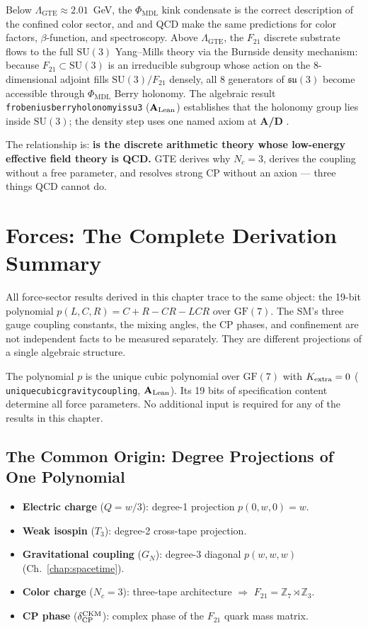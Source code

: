 \documentclass[11pt,openany]{book}
\theoremstyle{remark}
\newcommand{\GTE}{\text{GTE}}
\newcommand{\PHIMDL}{\Phi_{\mathrm{MDL}}}
\newcommand{\ZS}{\mathbb{Z}_7}
\newcommand{\lean}[1]{%
  \penalty-100
  \begingroup\def\_{\textunderscore\allowbreak}\texttt{#1}\endgroup}
\newcommand{\Nc}{N_c}
\newcommand{\CatAL}{\ensuremath{\textbf{A}_{\rm Lean}}}
\newcommand{\CatAD}{\textbf{A/D}}
\begin{document}
Below $\Lambda_{\GTE} \approx 2.01$~GeV, the $\PHIMDL$ kink condensate is the correct
description of the confined color sector, and \GTE{} and QCD make the same predictions
for color factors, $\beta$-function, and spectroscopy.  Above $\Lambda_{\GTE}$, the
$F_{21}$ discrete substrate flows to the full $\mathrm{SU}(3)$ Yang--Mills theory via the
Burnside density mechanism: because $F_{21} \subset \mathrm{SU}(3)$ is an irreducible
subgroup whose action on the 8-dimensional adjoint fills $\mathrm{SU}(3)/F_{21}$ densely,
all 8 generators of $\mathfrak{su}(3)$ become accessible through $\PHIMDL$ Berry
holonomy.  The algebraic result
\lean{frobenius\_berry\_holonomy\_is\_su3} (\CatAL) establishes that the holonomy group
lies inside $\mathrm{SU}(3)$; the density step uses one named axiom at \CatAD{}
\cite{SpivackGTEQCDStructure}.

The relationship is: \textbf{\GTE{} is the discrete arithmetic theory whose low-energy
effective field theory is QCD.}  GTE derives why $\Nc = 3$, derives the coupling
without a free parameter, and resolves strong CP without an axion --- three things QCD
cannot do.

\section{Forces: The Complete Derivation Summary}
\label{sec:forces_summary}

All force-sector results derived in this chapter trace to the same object: the 19-bit
\GTE{} polynomial $p(L,C,R) = C + R - CR - LCR$ over $\mathrm{GF}(7)$.  The SM's three
gauge coupling constants, the mixing angles, the CP phases, and confinement are not
independent facts to be measured separately.  They are different projections of a single
algebraic structure.

The polynomial $p$ is the unique cubic polynomial over $\mathrm{GF}(7)$ with $K_{\rm
extra} = 0$ (\lean{unique\_cubic\_gravity\_coupling}, \CatAL{}).  Its 19 bits of
specification content determine all force parameters.  No additional input is required
for any of the results in this chapter.

\subsection*{The Common Origin: Degree Projections of One Polynomial}

\begin{itemize}
\item \textbf{Electric charge} ($Q = w/3$): degree-1 projection $p(0, w, 0) = w$.
\item \textbf{Weak isospin} ($T_3$): degree-2 cross-tape projection.
\item \textbf{Gravitational coupling} ($G_N$): degree-3 diagonal $p(w,w,w)$ (Ch.~\ref{chap:spacetime}).
\item \textbf{Color charge} ($\Nc = 3$): three-tape architecture $\Rightarrow$ $F_{21} = \ZS \rtimes \mathbb{Z}_3$.
\item \textbf{CP phase} ($\delta_{\rm CP}^{\rm CKM}$): complex phase of the $F_{21}$ quark mass matrix.
\end{itemize}
\end{document}
